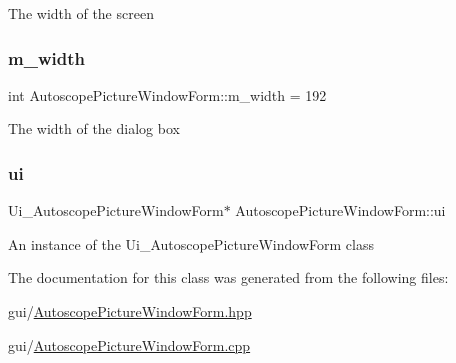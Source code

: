 The width of the screen \mbox{\label{class_autoscope_picture_window_form_aa5dacd6f9d13d4cafa98edae38d161f5}} 
\subsubsection{\texorpdfstring{m\_width}{m\_width}}
{\footnotesize\ttfamily int Autoscope\+Picture\+Window\+Form\+::m\+\_\+width = 192\hspace{0.3cm}{\ttfamily [private]}}

The width of the dialog box \mbox{\label{class_autoscope_picture_window_form_aac9815d1313c1814ff9f0eefa4eeb47d}} 
\subsubsection{\texorpdfstring{ui}{ui}}
{\footnotesize\ttfamily Ui\+\_\+\+Autoscope\+Picture\+Window\+Form$\ast$ Autoscope\+Picture\+Window\+Form\+::ui\hspace{0.3cm}{\ttfamily [private]}}

An instance of the Ui\+\_\+\+Autoscope\+Picture\+Window\+Form class 

The documentation for this class was generated from the following files\+:\begin{DoxyCompactItemize}
\item 
gui/\mbox{\hyperlink{_autoscope_picture_window_form_8hpp}{Autoscope\+Picture\+Window\+Form.\+hpp}}\item 
gui/\mbox{\hyperlink{_autoscope_picture_window_form_8cpp}{Autoscope\+Picture\+Window\+Form.\+cpp}}\end{DoxyCompactItemize}
